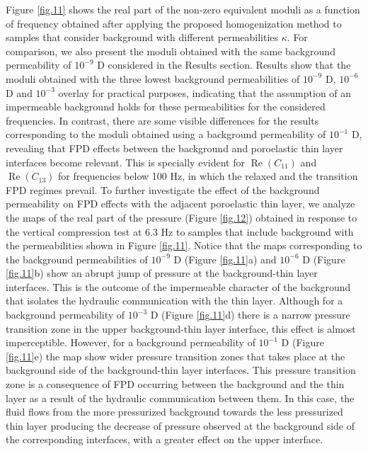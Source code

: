 \documentclass[draft]{agujournal2019}
\renewcommand{\Re}{\operatorname{Re} }
\begin{document}
Figure \ref{fig.11} shows the real part of the non-zero equivalent moduli as a function of frequency obtained after applying the proposed homogenization method to samples that consider background with different permeabilities $\kappa$. For comparison, we also present the moduli obtained with the same background permeability of $10^{-9}$ D considered in the Results section.
Results show that the moduli obtained with the three lowest background permeabilities of $10^{-9}$ D, $10^{-6}$ D and $10^{-3}$ overlay for practical purposes, indicating that the assumption of an impermeable background holds for these permeabilities for the considered frequencies. In contrast, there are some visible differences for the results corresponding to the moduli obtained using a background permeability of $10^{-1}$ D, revealing that FPD effects between the background and poroelastic thin layer interfaces become relevant. This is specially evident for $\Re(C_{11})$ and $\Re(C_{13})$ for frequencies below 100 Hz, in which the relaxed and the transition FPD regimes prevail. To further investigate the effect of the background permeability on FPD effects with the adjacent poroelastic thin layer, we analyze the maps of the real part of the pressure (Figure \ref{fig.12}) obtained in response to the vertical compression test at 6.3 Hz to samples that include background with the permeabilities shown in Figure \ref{fig.11}.
Notice that the maps corresponding to the background permeabilities of $10^{-9}$ D (Figure \ref{fig.11}a) and $10^{-6}$ D (Figure \ref{fig.11}b) show an abrupt jump of pressure at the background-thin layer interfaces. This is the outcome of the impermeable character of the background that isolates the hydraulic communication with the thin layer. Although for a background permeability of  $10^{-3}$ D (Figure \ref{fig.11}d) there is 
a narrow pressure transition zone in the  upper background-thin layer interface, this effect is almost imperceptible.
However, for a background permeability of  $10^{-1}$ D (Figure \ref{fig.11}e) the map show  wider pressure transition zones that takes place at the background side of the background-thin layer interfaces.
This pressure transition zone is a consequence of FPD occurring between the background and the thin layer as a result of the hydraulic communication between them. In this case, the fluid flows from the more pressurized background towards the less pressurized thin layer producing the decrease of pressure observed at the background side of the corresponding interfaces, with a greater effect on the upper interface. 
\end{document}
